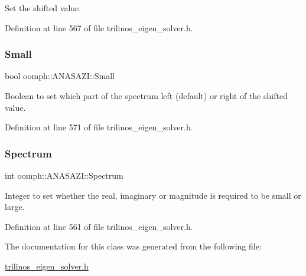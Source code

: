 Set the shifted value. 



Definition at line 567 of file trilinos\+\_\+eigen\+\_\+solver.\+h.

\mbox{\label{classoomph_1_1ANASAZI_abb61aa274f84bda2752fb0e7bcc4cbee}} 
\subsubsection{\texorpdfstring{Small}{Small}}
{\footnotesize\ttfamily bool oomph\+::\+A\+N\+A\+S\+A\+Z\+I\+::\+Small\hspace{0.3cm}{\ttfamily [private]}}



Boolean to set which part of the spectrum left (default) or right of the shifted value. 



Definition at line 571 of file trilinos\+\_\+eigen\+\_\+solver.\+h.

\mbox{\label{classoomph_1_1ANASAZI_a244c2eac42edb80948da8bcef92cf003}} 
\subsubsection{\texorpdfstring{Spectrum}{Spectrum}}
{\footnotesize\ttfamily int oomph\+::\+A\+N\+A\+S\+A\+Z\+I\+::\+Spectrum\hspace{0.3cm}{\ttfamily [private]}}



Integer to set whether the real, imaginary or magnitude is required to be small or large. 



Definition at line 561 of file trilinos\+\_\+eigen\+\_\+solver.\+h.



The documentation for this class was generated from the following file\+:\begin{DoxyCompactItemize}
\item 
\hyperlink{trilinos__eigen__solver_8h}{trilinos\+\_\+eigen\+\_\+solver.\+h}\end{DoxyCompactItemize}
